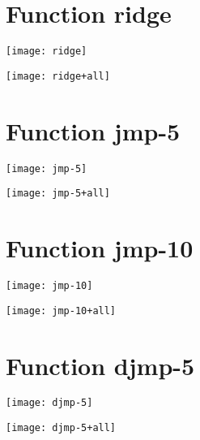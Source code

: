 \section{Function ridge}
\begin{center}

\end{center}
\begin{center}

\end{center}
\begin{center}
\texttt{[image: ridge]}
\end{center}
\begin{center}
\texttt{[image: ridge+all]}
\end{center}
\newpage
\section{Function jmp-5}
\begin{center}

\end{center}
\begin{center}

\end{center}
\begin{center}
\texttt{[image: jmp-5]}
\end{center}
\begin{center}
\texttt{[image: jmp-5+all]}
\end{center}
\newpage
\section{Function jmp-10}
\begin{center}

\end{center}
\begin{center}

\end{center}
\begin{center}
\texttt{[image: jmp-10]}
\end{center}
\begin{center}
\texttt{[image: jmp-10+all]}
\end{center}
\newpage
\section{Function djmp-5}
\begin{center}

\end{center}
\begin{center}

\end{center}
\begin{center}
\texttt{[image: djmp-5]}
\end{center}
\begin{center}
\texttt{[image: djmp-5+all]}
\end{center}
\newpage
